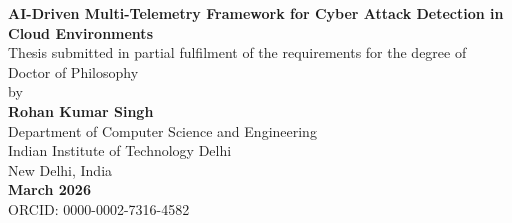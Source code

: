 \begin{titlepage}
    \centering
    {\Large \textbf{AI-Driven Multi-Telemetry Framework for Cyber Attack Detection in Cloud Environments}\\[1.5cm]}
    {\large Thesis submitted in partial fulfilment of the requirements for the degree of Doctor of Philosophy\\[0.5cm]}
    {\large by\\[0.3cm]}
{\Large \textbf{Rohan Kumar Singh}\\[1.5cm]}
{\large Department of Computer Science and Engineering\\[0.3cm]}
{\large Indian Institute of Technology Delhi}\\[0.3cm]
{\large New Delhi, India}\\[1.5cm]
{\large \textbf{March 2026}}\\[1.5cm]
{\small ORCID: 0000-0002-7316-4582}\par
\end{titlepage}
\cleardoublepage
